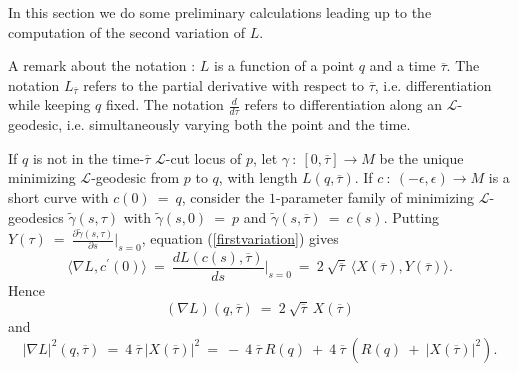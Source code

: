 In this section we do some preliminary calculations leading up to the
computation of the second variation of $L$.

A remark about the notation : $L$ is a function of
a point $q$ and a time $\overline{\tau}$. The notation
$L_{\overline{\tau}}$ refers to the partial derivative with
respect to $\overline{\tau}$, i.e. differentiation while keeping
$q$ fixed.  The notation $\frac{d}{d\tau}$ refers to differentiation
along an ${\mathcal L}$-geodesic, i.e. simultaneously
varying both the point and the time.

If $q$ is not in the time-$\overline{\tau}$
${\mathcal L}$-cut locus of $p$, let
$\gamma \: : \: [0, \overline{\tau}] \rightarrow M$ be the unique minimizing
${\mathcal L}$-geodesic from $p$ to $q$, with length $L(q, \overline{\tau})$.
If $c \: : \: (- \epsilon, \epsilon) \rightarrow M$ is a short curve
with $c(0) \: = \: q$, consider the $1$-parameter
family of minimizing ${\mathcal L}$-geodesics
$\tilde\gamma(s, \tau)$
with $\tilde\gamma(s, 0) \: = \: p$ and $\tilde\gamma(s, \overline{\tau})
\: =\: c(s)$. Putting $Y(\tau) \: =\:
\frac{\partial \tilde\gamma(s, \tau)}{\partial s} \Big|_{s=0}$,
equation (\ref{firstvariation}) gives
\begin{equation}
\langle \nabla L, c^\prime(0) \rangle \: = \:
\frac{dL(c(s), \overline{\tau})}{ds} \Big|_{s=0} \: = \:
2 \: \sqrt{\overline{\tau}} \:
\langle X(\overline{\tau}), Y(\overline{\tau}) \rangle.
\end{equation}
Hence
\begin{equation} \label{grad1}
(\nabla L)(q, \overline{\tau}) \: = \:
2 \: \sqrt{\overline{\tau}} \: X(\overline{\tau})
\end{equation}
and
\begin{equation} \label{gradsq}
|\nabla L|^2(q, \overline{\tau}) \: = \:
4 \: {\overline{\tau}} \: |X(\overline{\tau})|^2 \: = \:
- \: 4 \: {\overline{\tau}} \: R(q) \: + \:
4 \: {\overline{\tau}} \: \left( R(q) \: + \: |X(\overline{\tau})|^2 \right).
\end{equation}


